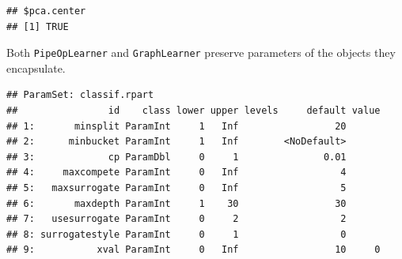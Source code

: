 \documentclass[]{scrbook}
\newenvironment{Shaded}{\begin{snugshade}}{\end{snugshade}}
\newcommand{\KeywordTok}[1]{\textcolor[rgb]{0.13,0.29,0.53}{\textbf{#1}}}
\newcommand{\NormalTok}[1]{#1}
\newcommand{\OperatorTok}[1]{\textcolor[rgb]{0.81,0.36,0.00}{\textbf{#1}}}
\newcommand{\StringTok}[1]{\textcolor[rgb]{0.31,0.60,0.02}{#1}}
\renewenvironment{Shaded} {\begin{snugshade}\small} {\end{snugshade}}
\begin{document}
\begin{Shaded}
\end{Shaded}

\begin{verbatim}
## $pca.center
## [1] TRUE
\end{verbatim}

Both \texttt{PipeOpLearner} and \texttt{GraphLearner} preserve parameters of the objects they encapsulate.

\begin{Shaded}
\end{Shaded}

\begin{verbatim}
## ParamSet: classif.rpart
##                id    class lower upper levels     default value
## 1:       minsplit ParamInt     1   Inf                 20      
## 2:      minbucket ParamInt     1   Inf        <NoDefault>      
## 3:             cp ParamDbl     0     1               0.01      
## 4:     maxcompete ParamInt     0   Inf                  4      
## 5:   maxsurrogate ParamInt     0   Inf                  5      
## 6:       maxdepth ParamInt     1    30                 30      
## 7:   usesurrogate ParamInt     0     2                  2      
## 8: surrogatestyle ParamInt     0     1                  0      
## 9:           xval ParamInt     0   Inf                 10     0
\end{verbatim}

\begin{Shaded}
\end{Shaded}
\end{document}
